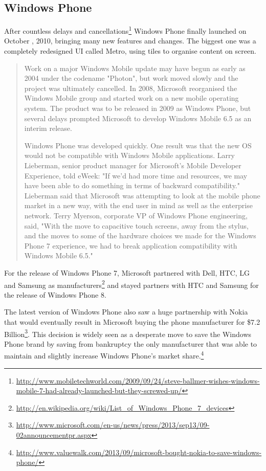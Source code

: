 \subsection{Windows Phone}
After countless delays and cancellations\footnote{\url{http://www.mobiletechworld.com/2009/09/24/steve-ballmer-wishes-windows-mobile-7-had-already-launched-but-they-screwed-up/}} Windows Phone finally launched on October , 2010, bringing many new features and changes. The biggest one was a completely redesigned UI called Metro, using tiles to organise content on screen.  
\begin{quotation}
Work on a major Windows Mobile update may have begun as early as 2004 under the codename "Photon", but work moved slowly and the project was ultimately cancelled. In 2008, Microsoft reorganised the Windows Mobile group and started work on a new mobile operating system. The product was to be released in 2009 as Windows Phone, but several delays prompted Microsoft to develop Windows Mobile 6.5 as an interim release.

Windows Phone was developed quickly. One result was that the new OS would not be compatible with Windows Mobile applications. Larry Lieberman, senior product manager for Microsoft's Mobile Developer Experience, told eWeek: "If we'd had more time and resources, we may have been able to do something in terms of backward compatibility." Lieberman said that Microsoft was attempting to look at the mobile phone market in a new way, with the end user in mind as well as the enterprise network. Terry Myerson, corporate VP of Windows Phone engineering, said, "With the move to capacitive touch screens, away from the stylus, and the moves to some of the hardware choices we made for the Windows Phone 7 experience, we had to break application compatibility with Windows Mobile 6.5."
\cite{wikipedia:windows_phone}
\end{quotation}


For the release of Windows Phone 7, Microsoft partnered with Dell, HTC, LG and Samsung as manufacturers\footnote{\url{http://en.wikipedia.org/wiki/List_of_Windows_Phone_7_devices}} and stayed partners with HTC and Samsung for the release of Windows Phone 8.


The latest version of Windows Phone also saw a huge partnership with Nokia that would eventually result in Microsoft buying the phone manufacturer for \$7.2 Billion\footnote{\url{http://www.microsoft.com/en-us/news/press/2013/sep13/09-02announcementpr.aspx}}. This decision is widely seen as a desperate move to save the Windows Phone brand by saving from bankruptcy the only manufacturer that was able to maintain and slightly increase Windows Phone's market share.\footnote{\url{http://www.valuewalk.com/2013/09/microsoft-bought-nokia-to-save-windows-phone/}}  
 






